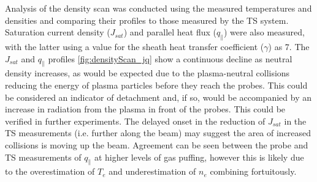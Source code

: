 \documentclass[a4paper, 11pt]{article} %
\begin{document}
	Analysis of the density scan was conducted using the measured temperatures and densities and comparing their profiles to those measured by the TS system. 
	Saturation current density ($J_{sat}$) and parallel heat flux ($q_{\parallel}$) were also measured, with the latter using a value for the sheath heat transfer coefficient ($\gamma$) as 7.
	The $J_{sat}$ and $q_{\parallel}$ profiles \cref{fig:densityScan_jq} show a continuous decline as neutral density increases, as would be expected due to the plasma-neutral collisions reducing the energy of plasma particles before they reach the probes.
	This could be considered an indicator of detachment and, if so, would be accompanied by an increase in radiation from the plasma in front of the probes. 
	This could be verified in further experiments.
	The delayed onset in the reduction of $J_{sat}$ in the TS measurements (i.e. further along the beam) may suggest the area of increased collisions is moving up the beam.
	Agreement can be seen between the probe and TS measurements of $q_{\parallel}$ at higher levels of gas puffing, however this is likely due to the overestimation of $T_e$ and underestimation of $n_e$ combining fortuitously.
	
\end{document}
